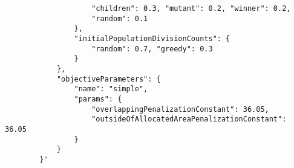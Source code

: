 \begin{listing}[h!]
\begin{verbatim}
                    "children": 0.3, "mutant": 0.2, "winner": 0.2,
                    "random": 0.1
                },
                "initialPopulationDivisionCounts": {
                    "random": 0.7, "greedy": 0.3
                }
            },
            "objectiveParameters": {
                "name": "simple",
                "params": {
                    "overlappingPenalizationConstant": 36.05,
                    "outsideOfAllocatedAreaPenalizationConstant": 36.05
                }
            }
        }'
    \end{verbatim}
    \cprotect\caption[Example of computation submission without instance name]
    {Example of computation submission using \verb|curl|\footnote{\url{https://curl.se/}} without specifying the instance name.
    Without it, everything has to be entered manually into the request – layout width and height, paintings together with their flow, and evaluation function.
    }

    \label{lst:computation-submission-manual}
\end{listing}


